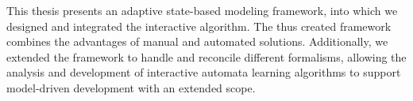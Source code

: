 This thesis presents an adaptive state-based modeling framework, into which we designed and integrated the interactive algorithm. The thus created framework combines the advantages of manual and automated solutions. Additionally, we extended the framework to handle and reconcile different formalisms, allowing the analysis and development of interactive automata learning algorithms to support model-driven development with an extended scope.



\vfill
\cleardoublepage

\selectthesislanguage

\setcounter{romanPage}{\value{page}}
